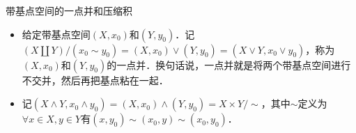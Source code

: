 \begin{definition}{带基点空间的一点并和压缩积}
\begin{itemize}
\item 给定带基点空间$(X, x_0)$和$(Y, y_0)$．记$(X\amalg Y)/(x_0\sim y_0)=(X, x_0)\vee(Y, y_0)=(X\vee Y, x_0\vee y_0)$，称为$(X, x_0)$和$(Y, y_0)$的一点并．换句话说，一点并就是将两个带基点空间进行不交并，然后再把基点粘在一起．

\item 记$(X\land Y, x_0\land y_0)=(X, x_0)\land(Y, y_0)=X\times Y/\sim$，其中$\sim$定义为$\forall x\in X, y\in Y$有$ (x, y_0)\sim(x_0, y)\sim(x_0, y_0)$．

\end{itemize}
\end{definition}
